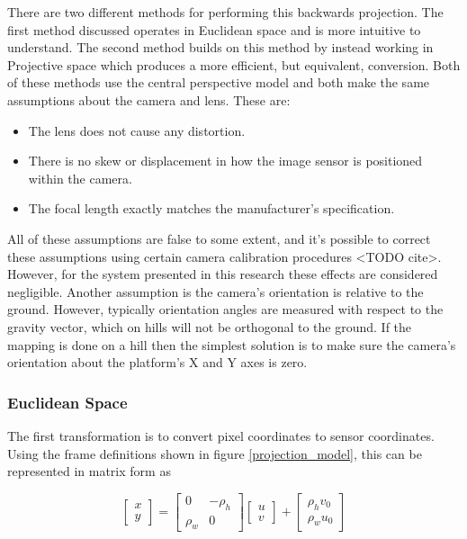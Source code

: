  There are two different methods for performing this backwards projection. The first method discussed operates in Euclidean space and is more intuitive to understand.  The second method builds on this method by instead working in Projective space which produces a more efficient, but equivalent, conversion.  Both of these methods use the central perspective model and both make the same assumptions about the camera and lens.  These are:
 \begin{itemize}
 \item The lens does not cause any distortion. 
 \item There is no skew or displacement in how the image sensor is positioned within the camera.
 \item The focal length exactly matches the manufacturer's specification.
 \end{itemize}

 All of these assumptions are false to some extent, and it's possible to correct these assumptions using certain camera calibration procedures <TODO cite>.  However, for the system presented in this research these effects are considered negligible.  Another assumption is the camera's orientation is relative to the ground.  However, typically orientation angles are measured with respect to the gravity vector, which on hills will not be orthogonal to the ground.  If the mapping is done on a hill then the simplest solution is to make sure the camera's orientation about the platform's X and Y axes is zero.
 
 \subsubsection{Euclidean Space}
 
 The first transformation is to convert pixel coordinates to sensor coordinates.  Using the frame definitions shown in figure \ref{projection_model}, this can be represented in matrix form as 
 
\[
\begin{bmatrix} x \\ y \end{bmatrix}
=
\begin{bmatrix} 
 0 & -\rho_h \\
 \rho_w & 0 
\end{bmatrix}
\begin{bmatrix} u \\ v \end{bmatrix}
+
\begin{bmatrix} \rho_h v_0 \\ \rho_w u_0 \end{bmatrix}
\]
 
